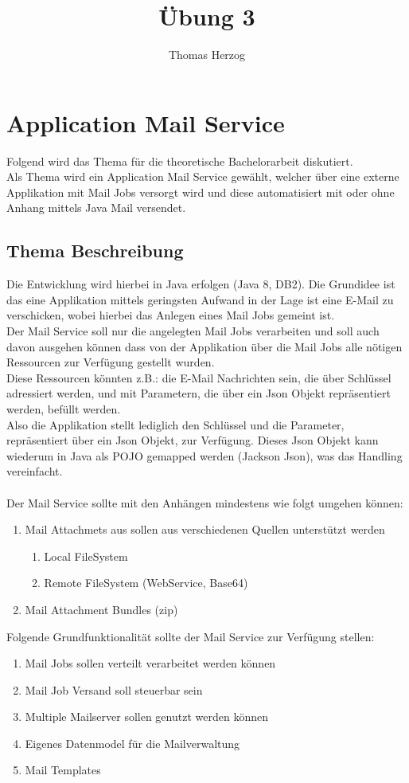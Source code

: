 \documentclass[11pt, a4paper, twoside]{article}   	%
\title{Übung 3}
\author{Thomas Herzog}
\begin{document}
\setlength{\headheight}{15mm}
{\color{myred}
	\section
		{Application Mail Service}
}
Folgend wird das Thema für die theoretische Bachelorarbeit diskutiert.\\
Als Thema wird ein Application Mail Service gewählt, welcher über eine externe Applikation mit Mail Jobs versorgt wird und diese automatisiert mit oder ohne Anhang mittels Java Mail versendet.\\

\subsection{Thema Beschreibung}
Die Entwicklung wird hierbei in Java erfolgen (Java 8, DB2).
Die Grundidee ist das eine Applikation mittels geringsten Aufwand in der Lage ist eine E-Mail zu verschicken, wobei hierbei das Anlegen eines Mail Jobs gemeint ist.\\
Der Mail Service soll nur die angelegten Mail Jobs verarbeiten und soll auch davon ausgehen können dass von der Applikation über die Mail Jobs alle nötigen Ressourcen zur Verfügung gestellt wurden.\\
Diese Ressourcen könnten z.B.: die E-Mail Nachrichten sein, die über Schlüssel adressiert werden, und mit Parametern, die über ein Json Objekt repräsentiert werden, befüllt werden.\\
Also die Applikation stellt lediglich den Schlüssel und die Parameter, repräsentiert über ein Json Objekt, zur Verfügung. Dieses Json Objekt kann wiederum in Java als POJO gemapped werden (Jackson Json), was das Handling vereinfacht.\\\\ 
Der Mail Service sollte mit den Anhängen mindestens wie folgt umgehen können:
\begin{enumerate}
	\item Mail Attachmets aus sollen aus verschiedenen Quellen unterstützt werden\begin{enumerate}
		\item Local FileSystem
		\item Remote FileSystem (WebService, Base64)
	\end{enumerate}
	\item Mail Attachment Bundles (zip)
\end{enumerate}
Folgende Grundfunktionalität sollte der Mail Service zur Verfügung stellen:
\begin{enumerate}
	\item Mail Jobs sollen verteilt verarbeitet werden können
	\item Mail Job Versand soll steuerbar sein 
	\item Multiple Mailserver sollen genutzt werden können
	\item Eigenes Datenmodel für die Mailverwaltung
	\item Mail Templates
\end{enumerate}
\end{document}
